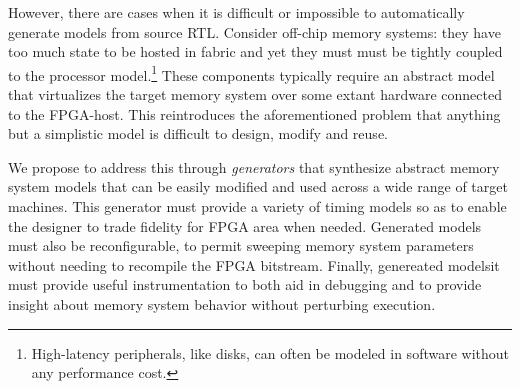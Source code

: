 However, there are cases when it is difficult or impossible to automatically
generate models from source RTL. Consider off-chip memory systems: they have
too much state to be hosted in fabric and yet they must must be tightly coupled
to the processor model.\footnote{High-latency peripherals, like disks, can
often be modeled in software without any performance cost.\cite{disksim}} These
components typically require an abstract model that virtualizes the target
memory system over some extant hardware connected to the FPGA-host. This
reintroduces the aforementioned problem that anything but a simplistic model is
difficult to design, modify and reuse.

We propose to address this through \emph{generators} that synthesize abstract
memory system models that can be easily modified and used across a wide range
of target machines. This generator must provide a variety of timing models so
as to enable the designer to trade fidelity for FPGA area when needed.
Generated models must also be reconfigurable, to permit sweeping memory system
parameters without needing to recompile the FPGA bitstream. Finally, genereated
modelsit must provide useful instrumentation to both aid in debugging and to
provide insight about memory system behavior without perturbing execution.
